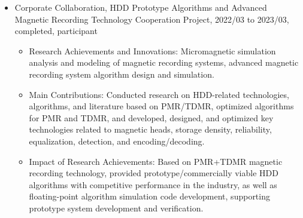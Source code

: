 \documentclass[en]{resume}
\begin{document}
\begin{itemize}
  \item Corporate Collaboration, HDD Prototype Algorithms and Advanced Magnetic Recording Technology Cooperation Project, 2022/03 to 2023/03, completed, participant
  \begin{itemize}
    \item Research Achievements and Innovations: Micromagnetic simulation analysis and modeling of magnetic recording systems, advanced magnetic recording system algorithm design and simulation.
    \item Main Contributions: Conducted research on HDD-related technologies, algorithms, and literature based on PMR/TDMR, optimized algorithms for PMR and TDMR, and developed, designed, and optimized key technologies related to magnetic heads, storage density, reliability, equalization, detection, and encoding/decoding.
    \item Impact of Research Achievements: Based on PMR+TDMR magnetic recording technology, provided prototype/commercially viable HDD algorithms with competitive performance in the industry, as well as floating-point algorithm simulation code development, supporting prototype system development and verification.
  \end{itemize}
\end{itemize}

\end{document}
